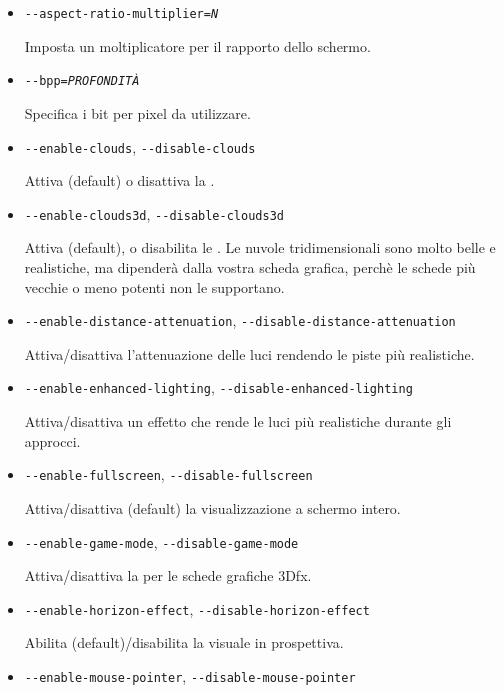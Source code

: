 \begin{itemize}
{\begin{itemize}
  \item{\texttt{-$ $-aspect-ratio-multiplier={\it N}}}

  Imposta un moltiplicatore per il rapporto dello schermo.

  \item{\texttt{-$ $-bpp={\it PROFONDIT\`{A}}}}

  Specifica i bit per pixel da utilizzare.

  \item{\texttt{-$ $-enable-clouds}, \texttt{-$ $-disable-clouds}}

  Attiva (default) o disattiva la .

  \item{\texttt{-$ $-enable-clouds3d}, \texttt{-$ $-disable-clouds3d}}

  Attiva (default), o disabilita le . Le nuvole tridimensionali sono
  molto belle e realistiche, ma dipender\`{a} dalla vostra scheda grafica,
  perch\`{e} le schede pi\`{u} vecchie o meno potenti non le supportano.

  \item{\texttt{-$ $-enable-distance-attenuation}, \texttt{-$ $-disable-distance-attenuation}}

  Attiva/disattiva l'attenuazione delle luci rendendo le piste pi\`{u} realistiche.

  \item{\texttt{-$ $-enable-enhanced-lighting}, \texttt{-$ $-disable-enhanced-lighting}}

  Attiva/disattiva un effetto che rende le luci pi\`{u} realistiche durante gli approcci.

  \item{\texttt{-$ $-enable-fullscreen}, \texttt{-$ $-disable-fullscreen}}

  Attiva/disattiva (default) la visualizzazione a schermo intero.

  \item{\texttt{-$ $-enable-game-mode}, \texttt{-$ $-disable-game-mode}}

  Attiva/disattiva la  per le schede grafiche 3Dfx.

  \item{\texttt{-$ $-enable-horizon-effect}, \texttt{-$ $-disable-horizon-effect}}

  Abilita (default)/disabilita la visuale in prospettiva.

  \item{\texttt{-$ $-enable-mouse-pointer}, \texttt{-$ $-disable-mouse-pointer}}


\end{itemize}}
\end{itemize}
